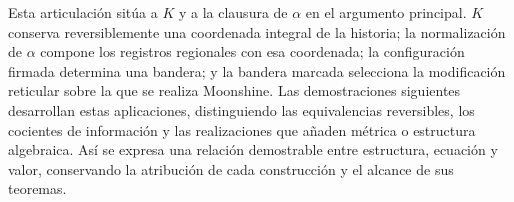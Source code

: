Esta articulación sitúa a $K$ y a la clausura de $\alpha$ en el argumento
principal. $K$ conserva reversiblemente una coordenada integral de la
historia; la normalización de $\alpha$ compone los registros regionales
con esa coordenada; la configuración firmada determina una bandera; y
la bandera marcada selecciona la modificación reticular sobre la que se
realiza Moonshine. Las demostraciones siguientes desarrollan estas
aplicaciones, distinguiendo las equivalencias reversibles, los cocientes
de información y las realizaciones que añaden métrica o estructura
algebraica. Así se expresa una relación demostrable entre estructura,
ecuación y valor, conservando la atribución de cada construcción y el
alcance de sus teoremas.




